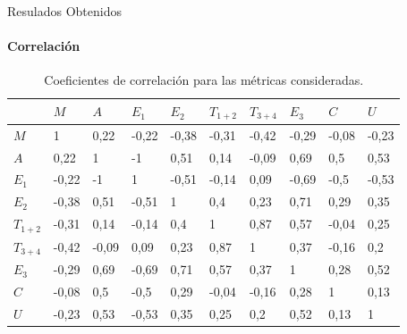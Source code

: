 \begin{frame}{Resulados Obtenidos}
\framesubtitle{Correlaci\'on}
\begin{table}[H] 
\centering
\footnotesize
\begin{tabular}{|p{0.7cm}|p{0.7cm}|p{0.7cm}|p{0.7cm}|p{0.7cm}|p{0.7cm}|p{0.7cm}|p{0.7cm}|p{0.7cm}|p{0.7cm}|}
\hline
& $M$ &  $A$  &   $E_1$ &  $E_2$  &  $T_{1+2}$  & $T_{3+4}$     & $E_3$ & $C$ & $U$ \\
\hline
$M$       &  1     &  0,22  & -0,22  & -0,38  &  -0,31  &  -0,42  &  -0,29 & -0,08    &  -0,23 \\
$A$       &  0,22  &  1  &  -1  &  0,51  &  0,14  &  -0,09  &  0,69  &  0,5           &  0,53 \\
$E_1$     &  -0,22 &  -1  &  1  &  -0,51  &  -0,14  &  0,09  &  -0,69  &  -0,5        &  -0,53 \\
$E_2$     &  -0,38 &  0,51  &  -0,51  &  1  &  0,4  &  0,23  &  0,71  &  0,29         &  0,35  \\
$T_{1+2}$ &  -0,31 &  0,14  &  -0,14  &  0,4  &  1  &  0,87  &  0,57  &  -0,04        &  0,25 \\
$T_{3+4}$ &  -0,42 &  -0,09  &  0,09  &  0,23  &  0,87  &  1  &  0,37  &  -0,16       &  0,2 \\
$E_3$     &  -0,29 &  0,69  &  -0,69  &  0,71  &  0,57  &  0,37  &  1  &  0,28        &  0,52 \\
$C$       &  -0,08 &  0,5  &  -0,5  &  0,29  &  -0,04  &  -0,16  &  0,28  &  1        &  0,13 \\
$U$       &  -0,23 &  0,53  &  -0,53  &  0,35  &  0,25  &  0,2  &  0,52  &  0,13      &  1 \\
\hline
\end{tabular}
\caption{Coeficientes de correlaci\'on para las m\'etricas consideradas.}
\label{sec:tabla-correlacion}
\end{table}

\end{frame}


